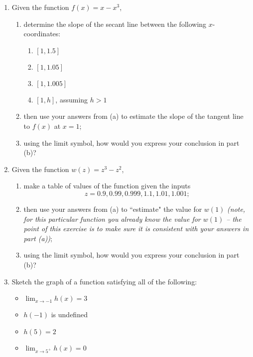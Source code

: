 \documentclass[12pt]{article}
\begin{document}
\begin{enumerate}

\item Given the function $f(x)=x-x^3$, 
\begin{enumerate}
	\item determine the slope of the secant line between the following $x$-coordinates:
	\begin{multicols}{3}
	\begin{enumerate}
		\item $\left[1,1.5\right]$
		\item $\left[1,1.05\right]$
		\item $\left[1,1.005\right]$
		\item $\left[1,h\right]$, assuming $h>1$
	\end{enumerate}
	\end{multicols}
	
	\item then use your answers from (a) to estimate the slope of the tangent line to $f(x)$ at $x=1$;

	\item using the limit symbol, how would you express your conclusion in part (b)?
\end{enumerate}

\item Given the function $w(z)=z^3-z^2$,
\begin{enumerate}
	\item make a table of values of the function given the inputs
	\[
	z=0.9,0.99,0.999,1.1,1.01,1.001;
	\]
	\item then use your answers from (a) to ``estimate" the value for $w(1)$ \textit{(note, for this particular function you already know the value for $w(1)$ -- the point of this exercise is to make sure it is consistent with your answers in part (a))};
	\item using the limit symbol, how would you express your conclusion in part (b)?
\end{enumerate}	
\item Sketch the graph of a function satisfying all of the following:
\begin{multicols}{2}
\begin{itemize}
\item $\lim_{x\to -1}h(x)=3$
\item $h(-1)$ is undefined
\item $h(5)=2$
\item $\lim_{x\to 5^+}h(x)=0$
\end{itemize}
\end{multicols}


\end{enumerate}
\end{document}
